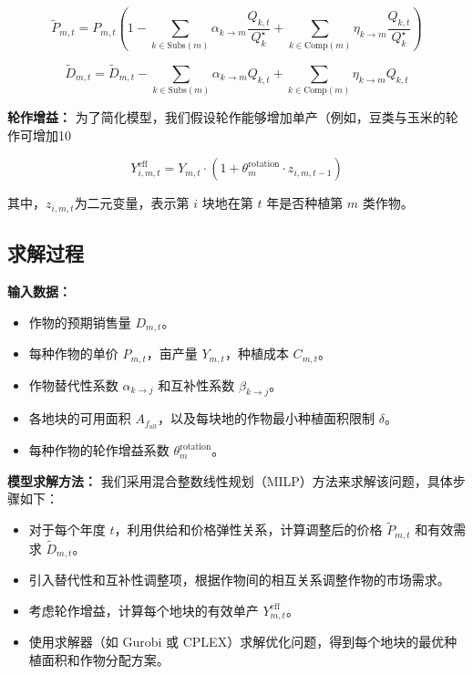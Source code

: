\begin{equation}
  \tilde{P}_{m,t} = P_{m,t} \left( 1 - \sum_{k \in \text{Subs}(m)} \alpha_{k \to m} \frac{Q_{k,t}}{Q_{k}^{\star}} + \sum_{k \in \text{Comp}(m)} \eta_{k \to m} \frac{Q_{k,t}}{Q_{k}^{\star}} \right)
\end{equation}

\begin{equation}
  \tilde{D}_{m,t} = \tilde{D}_{m,t} - \sum_{k \in \text{Subs}(m)} \alpha_{k \to m} Q_{k,t} + \sum_{k \in \text{Comp}(m)} \eta_{k \to m} Q_{k,t}
\end{equation}

\textbf{轮作增益：}  
为了简化模型，我们假设轮作能够增加单产（例如，豆类与玉米的轮作可增加10%

\begin{equation}
  Y_{i,m,t}^{\text{eff}} = Y_{m,t} \cdot \left( 1 + \theta^{\text{rotation}}_m \cdot z_{i,m,t-1} \right)
\end{equation}

其中，$z_{i,m,t}$为二元变量，表示第 $i$ 块地在第 $t$ 年是否种植第 $m$ 类作物。

\subsection[\hspace{-2pt}求解过程]{{\heiti{} \hspace{-8pt}求解过程}}\label{section3: 求解过程}

\textbf{输入数据：}  
\begin{itemize}
  \item 作物的预期销售量 $D_{m,t}$。
  \item 每种作物的单价 $P_{m,t}$，亩产量 $Y_{m,t}$，种植成本 $C_{m,t}$。
  \item 作物替代性系数 $\alpha_{k \to j}$ 和互补性系数 $\beta_{k \to j}$。
  \item 各地块的可用面积 $A_{f_{all}}$，以及每块地的作物最小种植面积限制 $\delta$。
  \item 每种作物的轮作增益系数 $\theta^{\text{rotation}}_m$。
\end{itemize}

\textbf{模型求解方法：}  
我们采用混合整数线性规划（MILP）方法来求解该问题，具体步骤如下：

\begin{itemize}
  \item 对于每个年度 $t$，利用供给和价格弹性关系，计算调整后的价格 $\tilde{P}_{m,t}$ 和有效需求 $\tilde{D}_{m,t}$。
  \item 引入替代性和互补性调整项，根据作物间的相互关系调整作物的市场需求。
  \item 考虑轮作增益，计算每个地块的有效单产 $Y_{m,t}^{\text{eff}}$。
  \item 使用求解器（如 Gurobi 或 CPLEX）求解优化问题，得到每个地块的最优种植面积和作物分配方案。
\end{itemize}


